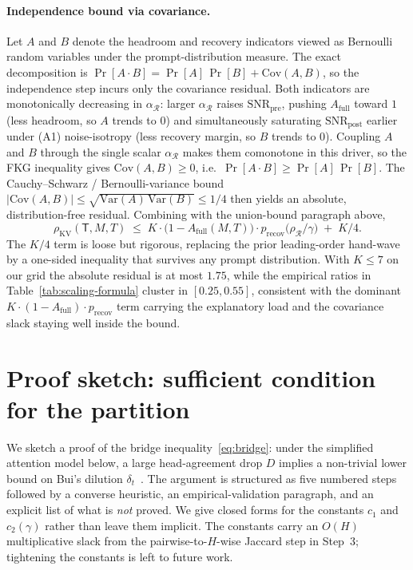 \documentclass{article}
\begin{document}
\paragraph{Independence bound via covariance.} Let $A$ and $B$ denote the
headroom and recovery indicators viewed as Bernoulli random variables under
the prompt-distribution measure. The exact decomposition is
$\Pr[A \cdot B] = \Pr[A]\,\Pr[B] + \mathrm{Cov}(A, B)$, so the independence
step incurs only the covariance residual. Both indicators are monotonically
decreasing in $\alpha_{\mathcal{R}}$: larger $\alpha_{\mathcal{R}}$ raises
$\mathrm{SNR}_{\mathrm{pre}}$, pushing $A_{\mathrm{full}}$ toward $1$ (less
headroom, so $A$ trends to $0$) and simultaneously saturating
$\mathrm{SNR}_{\mathrm{post}}$ earlier under (A1) noise-isotropy (less
recovery margin, so $B$ trends to $0$). Coupling $A$ and $B$ through the
single scalar $\alpha_{\mathcal{R}}$ makes them comonotone in this driver,
so the FKG inequality gives $\mathrm{Cov}(A, B) \ge 0$, i.e.\
$\Pr[A \cdot B] \ge \Pr[A]\,\Pr[B]$. The Cauchy--Schwarz / Bernoulli-variance
bound $|\mathrm{Cov}(A, B)| \le \sqrt{\mathrm{Var}(A)\,\mathrm{Var}(B)} \le 1/4$
then yields an absolute, distribution-free residual. Combining with the
union-bound paragraph above,
\[
\rho_{\mathrm{KV}}(\mathsf{T}, M, T)
\;\le\; K \cdot \bigl(1 - A_{\mathrm{full}}(M, T)\bigr)
\cdot p_{\mathrm{recov}}\bigl(\rho_{\mathcal{R}} / \gamma\bigr)
\;+\; K/4.
\]
The $K/4$ term is loose but rigorous, replacing the prior leading-order
hand-wave by a one-sided inequality that survives any prompt distribution.
With $K \le 7$ on our grid the absolute residual is at most $1.75$, while the
empirical ratios in Table~\ref{tab:scaling-formula} cluster in $[0.25, 0.55]$,
consistent with the dominant $K \cdot (1 - A_{\mathrm{full}}) \cdot
p_{\mathrm{recov}}$ term carrying the explanatory load and the covariance
slack staying well inside the bound.

\section{Proof sketch: sufficient condition for the partition}
\label{app:sufficient}

We sketch a proof of the bridge inequality~\eqref{eq:bridge}: under the
simplified attention model below, a large head-agreement drop $D$
implies a non-trivial lower bound on Bui's dilution
$\delta_t$~\citep{arxiv260509649}. The argument is structured as five
numbered steps followed by a converse heuristic, an empirical-validation
paragraph, and an explicit list of what is \emph{not} proved. We give
closed forms for the constants $c_1$ and $c_2(\gamma)$ rather than
leave them implicit. The constants carry an $O(H)$ multiplicative slack
from the pairwise-to-$H$-wise Jaccard step in Step~3; tightening the
constants is left to future work.
\end{document}
